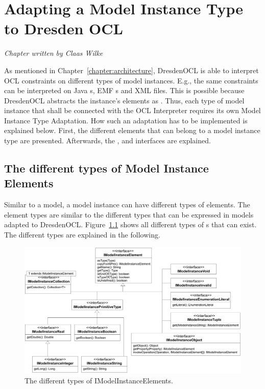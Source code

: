 \chapter{Adapting a Model Instance Type to Dresden OCL}
\label{chapter:modelInstanceTypeAdaptation}

\begin{flushright}
\textit{Chapter written by Claas Wilke}
\end{flushright}

As mentioned in Chapter~\ref{chapter:architecture}, DresdenOCL is able to
interpret \acs{OCL} constraints on different types of model instances. E.g., 
the same constraints can be interpreted on Java s, \acs{EMF}
s and \acs{XML} files. This is possible because DresdenOCL
abstracts the instance's elements as . Thus, each
type of model instance that shall be connected with the \acs{OCL} Interpreter 
requires its own Model Instance Type Adaptation. How such an adaptation has to
be implemented is explained below. First, the different elements that can 
belong to a model instance type are presented. Afterwards, the
,  and 
 interfaces are explained.


\section{The different types of Model Instance Elements}

Similar to a model, a model instance can have different types of elements. The
element types are similar to the different types that can be expressed in 
models adapted to DresdenOCL. 
Figure~\ref{pic:modelInstanceTypeAdaptation:typeHierarchy} shows all different 
types of s that can exist. The different types are
explained in the following.

\begin{figure}
	\centering
	\includegraphics[width=1.0\linewidth]{figures/modelInstanceTypeAdaptation/typeHierarchy}
	\caption{The different types of IModelInstanceElements.}
	\label{pic:modelInstanceTypeAdaptation:typeHierarchy}
\end{figure}


